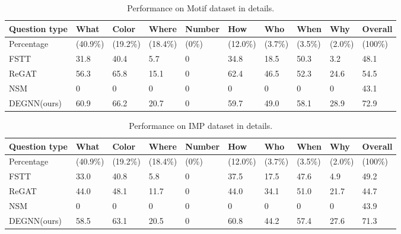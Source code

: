 \begin{table*}
\centering
    \begin{tabular}{l|lllllllll}
    \hline
    \textbf{Question type}&\textbf{What}&\textbf{Color}&\textbf{Where}&\textbf{Number}&\textbf{How}&\textbf{Who}&\textbf{When}&\textbf{Why}&\textbf{Overall}\\
    \hline
     Percentage &(40.9\%) &(19.2\%) &(18.4\%) &(0\%) &(12.0\%) &(3.7\%) &(3.5\%) &(2.0\%) &(100\%)\\
    \hline
     FSTT &31.8 &40.4 &5.7 &0 &34.8 &18.5 &50.3 &3.2 &48.1\\
     ReGAT &56.3 &65.8 &15.1 &0 &62.4 &46.5 &52.3 &24.6 &54.5\\
     NSM &0 &0 &0 &0 &0 &0 &0 &0 &43.1\\
     DEGNN(ours) &60.9 &66.2 &20.7 &0 &59.7 &49.0 &58.1 &28.9 &72.9\\
    \hline
    \end{tabular}
\caption{\label{Motif-detail}
Performance on Motif dataset in details.
}
\end{table*}

\begin{table*}
\centering
    \begin{tabular}{l|lllllllll}
    \hline
    \textbf{Question type}&\textbf{What}&\textbf{Color}&\textbf{Where}&\textbf{Number}&\textbf{How}&\textbf{Who}&\textbf{When}&\textbf{Why}&\textbf{Overall}\\
    \hline
     Percentage &(40.9\%) &(19.2\%) &(18.4\%) &(0\%) &(12.0\%) &(3.7\%) &(3.5\%) &(2.0\%) &(100\%)\\
    \hline
     FSTT &33.0 &40.8 &5.8 &0 &37.5 &17.5 &47.6 &4.9 &49.2\\
     ReGAT &44.0 &48.1 &11.7 &0 &44.0 &34.1 &51.0 &21.7 &44.7\\
     NSM &0 &0 &0 &0 &0 &0 &0 &0 &43.9\\
     DEGNN(ours) &58.5 &63.1 &20.5 &0 &60.8 &44.2 &57.4 &27.6 &71.3\\
    \hline
    \end{tabular}
\caption{\label{IMP-detail}
Performance on IMP dataset in details.
}
\end{table*}

